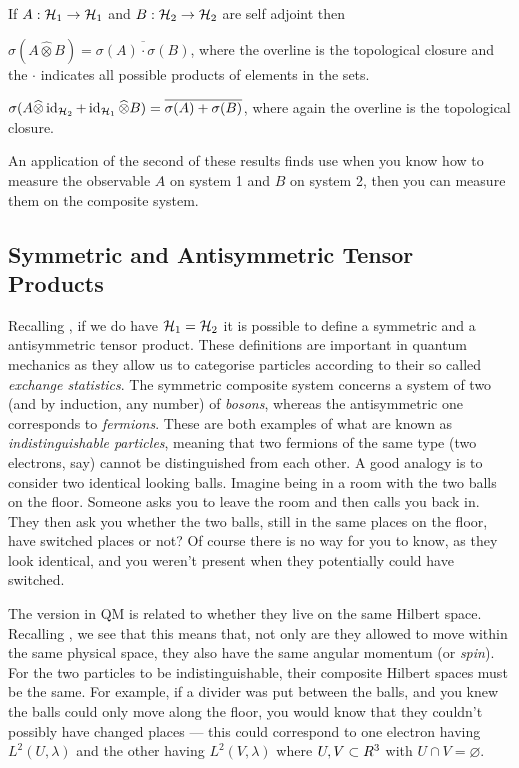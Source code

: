 \bt 
\label{thrm:SigmaTensorProduct}
If $A:\cH_1\to\cH_1$ and $B:\cH_2\to\cH_2$ are self adjoint then
\ben[label=(\roman*)]
\item $\sigma(A\widehat{\otimes} B) = \overline{\sigma(A)\cdot\sigma(B)}$, where the overline is the topological closure and the $\cdot$ indicates all possible products of elements in the sets. 
\item $\sigma(A\widehat{\otimes}\id_{\cH_2} + \id_{\cH_1}\widehat{\otimes} B) = \overline{\sigma(A)+\sigma(B)}$, where again the overline is the topological closure.
\een
\et 

An application of the second of these results finds use when you know how to measure the observable $A$ on system 1 and $B$ on system 2, then you can measure them on the composite system. 

\subsection{Symmetric and Antisymmetric Tensor Products}

Recalling , if we do have $\cH_1=\cH_2$ it is possible to define a symmetric and a antisymmetric tensor product. These definitions are important in quantum mechanics as they allow us to categorise particles according to their so called \emph{exchange statistics}. The symmetric composite system concerns a system of two (and by induction, any number) of \emph{bosons}, whereas the antisymmetric one corresponds to \emph{fermions}. These are both examples of what are known as \emph{indistinguishable particles}, meaning that two fermions of the same type (two electrons, say) cannot be distinguished from each other. 
A good analogy is to consider two identical looking balls. Imagine being in a room with the two balls on the floor. Someone asks you to leave the room and then calls you back in. They then ask you whether the two balls, still in the same places on the floor, have switched places or not? Of course there is no way for you to know, as they look identical, and you weren't present when they potentially could have switched. 

The version in QM is related to whether they live on the same Hilbert space. Recalling , we see that this means that, not only are they allowed to move within the same physical space, they also have the same angular momentum (or \emph{spin}). For the two particles to be indistinguishable, their composite Hilbert spaces must be the same. For example, if a divider was put between the balls, and you knew the balls could only move along the floor, you would know that they couldn't possibly have changed places --- this could correspond to one electron having $L^2(U,\lambda)$ and the other having $L^2(V,\lambda)$ where $U,V\ss R^3$ with $U\cap V =\varnothing$.

